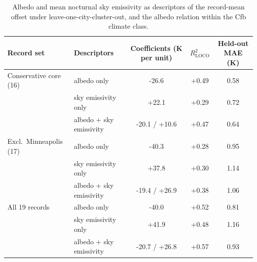 \begin{table}[!tbp]
\centering\footnotesize
\caption{Albedo and mean nocturnal sky emissivity as descriptors of the record-mean offset under leave-one-city-cluster-out, and the albedo relation within the Cfb climate class.}
\label{tab:b1}
\setlength{\tabcolsep}{5pt}
\begin{tabular}{@{}llccc@{}}
\toprule
Record set & Descriptors & Coefficients (K per unit) & $R^2_{\mathrm{LOCO}}$ & Held-out MAE (K) \\
\midrule
Conservative core (16) & albedo only & -26.6 & +0.49 & 0.58 \\
 & sky emissivity only & +22.1 & +0.29 & 0.72 \\
 & albedo + sky emissivity & -20.1 / +10.6 & +0.47 & 0.64 \\
\addlinespace
Excl.\ Minneapolis (17) & albedo only & -40.3 & +0.28 & 0.95 \\
 & sky emissivity only & +37.8 & +0.30 & 1.14 \\
 & albedo + sky emissivity & -19.4 / +26.9 & +0.38 & 1.06 \\
\addlinespace
All 19 records & albedo only & -40.0 & +0.52 & 0.81 \\
 & sky emissivity only & +41.9 & +0.48 & 1.16 \\
 & albedo + sky emissivity & -20.7 / +26.8 & +0.57 & 0.93 \\
\bottomrule
\end{tabular}
\par{}
\end{table}
